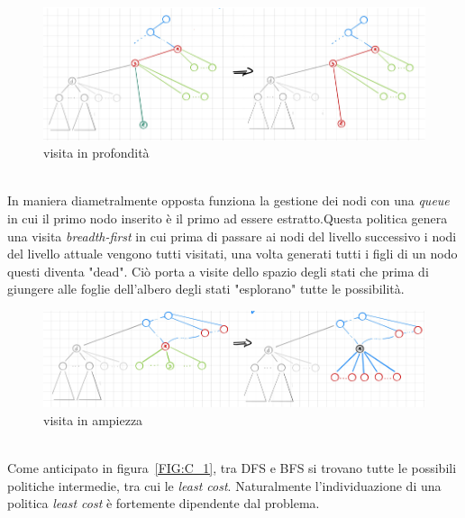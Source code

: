 \documentclass[a4paper]{article}
\begin{document}
\begin{figure}[!ht]
\centering
\includegraphics[width=1\textwidth]{./img/C_1_DFS.png}
\caption{visita in profondità} \label{FIG:C_1_DFS}
\end{figure}\\
In maniera diametralmente opposta funziona la gestione dei nodi con una \emph{queue} in cui il primo nodo inserito è il primo ad essere estratto.Questa politica genera una visita \textit{breadth-first} in cui prima di passare ai nodi del livello successivo i nodi del livello attuale vengono tutti visitati, una volta generati tutti i figli di un nodo questi diventa "dead".
Ciò porta a visite dello spazio degli stati che prima di giungere alle foglie dell'albero degli stati "esplorano" tutte le possibilità.
\begin{figure}[!ht]
\centering
\includegraphics[width=1\textwidth]{./img/C_1_BFS.png}
\caption{visita in ampiezza} \label{FIG:C_1_BFS}
\end{figure}\\
Come anticipato in figura~\ref{FIG:C_1}, tra DFS e BFS si trovano tutte le possibili politiche intermedie, tra cui le \textit{least cost}. Naturalmente l'individuazione di una politica \textit{least cost} è fortemente dipendente dal problema.
\end{document}
